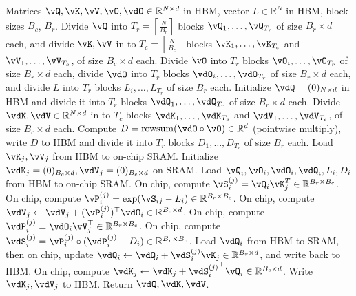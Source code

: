 \begin{algorithm}[h]
  \caption{\small\label{alg:flash_bwd}\sysname Backward Pass}
  \begin{algorithmic}[1]
    \REQUIRE Matrices $\vQ, \vK, \vV, \vO, \vdO \in \mathbb{R}^{N \times d}$ in HBM,
    vector $L \in \mathbb{R}^N$ in HBM, block sizes $B_c$, $B_r$.
    \STATE Divide $\vQ$ into $T_r = \left\lceil\frac{N}{B_r} \right\rceil$ blocks $\vQ_1, \dots, \vQ_{T_r}$ of size $B_r \times d$ each,
    and divide $\vK, \vV$ in to $T_c = \left\lceil \frac{N}{B_c} \right\rceil$ blocks $\vK_1, \dots, \vK_{T_c}$ and
    $\vV_1, \dots, \vV_{T_c}$, of size $B_c \times d$ each.
    \STATE Divide $\vO$ into $T_r$ blocks $\vO_i, \dots, \vO_{T_r}$ of size
    $B_r \times d$ each, divide $\vdO$ into $T_r$ blocks $\vdO_i, \dots, \vdO_{T_r}$
    of size $B_r \times d$ each, and divide $L$ into $T_r$ blocks $L_i, \dots, L_{T_r}$ of size
    $B_r$ each.
    \STATE Initialize $\vdQ = (0)_{N \times d}$ in HBM and divide it into $T_r$ blocks $\vdQ_1, \dots, \vdQ_{T_r}$ of size $B_r \times d$ each.
    Divide $\vdK, \vdV \in \mathbb{R}^{N \times d}$ in to $T_c$ blocks $\vdK_1, \dots, \vdK_{T_c}$ and
    $\vdV_1, \dots, \vdV_{T_c}$, of size $B_c \times d$ each.
    \STATE Compute $D = \mathrm{rowsum}(\vdO \circ \vO) \in \mathbb{R}^d$ (pointwise multiply), write
    $D$ to HBM and divide it into $T_r$ blocks $D_1, \dots, D_{T_r}$ of size
    $B_r$ each.
      \STATE Load $\vK_j, \vV_j$ from HBM to on-chip SRAM.
      \STATE Initialize $\vdK_j = (0)_{B_c \times d}, \vdV_j = (0)_{B_c \times d}$ on SRAM.
        \STATE Load $\vQ_i, \vO_i, \vdO_i, \vdQ_i, L_i, D_i$ from HBM to on-chip SRAM.
        \STATE On chip, compute $\vS_{i}^{(j)} = \vQ_i \vK_j^T \in \mathbb{R}^{B_r \times B_c}$.
        \STATE On chip, compute $\vP_{i}^{(j)} = \exp(\vS_{ij} - L_{i}) \in \mathbb{R}^{B_r \times B_c}$.
        \STATE On chip, compute
        $\vdV_j \leftarrow \vdV_j + (\vP_{i}^{(j)})^\top \vdO_i \in \mathbb{R}^{B_c \times d}$.
        \STATE On chip, compute
        $\vdP_{i}^{(j)} = \vdO_{i} \vV_j^\top \in \mathbb{R}^{B_r \times B_c}$.
        \STATE On chip, compute $\vdS_{i}^{(j)} = \vP_{i}^{(j)} \circ (\vdP_{i}^{(j)} - D_i) \in \mathbb{R}^{B_r \times B_c}$.
        \STATE Load $\vdQ_i$ from HBM to SRAM, then on chip, update
        $\vdQ_{i} \leftarrow \vdQ_i + \vdS_{i}^{(j)} \vK_j \in \mathbb{R}^{B_r \times d}$, and write
        back to HBM.
        \STATE On chip, compute $\vdK_{j} \leftarrow \vdK_j + {\vdS_{i}^{(j)}}^\top \vQ_i \in \mathbb{R}^{B_c \times d}$.
      \ENDFOR
      \STATE Write $\vdK_j, \vdV_j$ to HBM.
    \ENDFOR
    \STATE Return $\vdQ, \vdK, \vdV$.
  \end{algorithmic}
\end{algorithm}